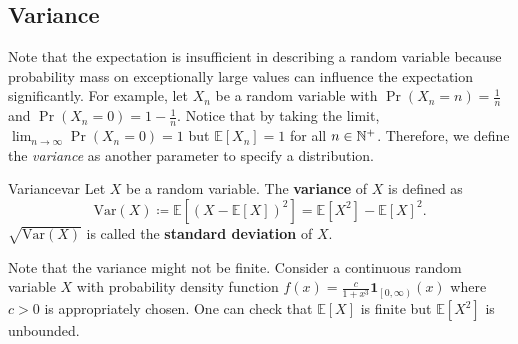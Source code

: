 \documentclass[math, code]{amznotes}
\theoremstyle{remark}
\begin{document}
\subsection{Variance}
Note that the expectation is insufficient in describing a random variable because probability mass on exceptionally large values can influence the expectation significantly. For example, let $X_n$ be a random variable with $\Pr\left(X_n = n\right) = \frac{1}{n}$ and $\Pr\left(X_n = 0\right) = 1 - \frac{1}{n}$. Notice that by taking the limit, $\lim_{n \to \infty}\Pr\left(X_n = 0\right) = 1$ but $\mathbb{E}\left[X_n\right] = 1$ for all $n \in \mathbb{N}^+$. Therefore, we define the \textit{variance} as another parameter to specify a distribution.
\begin{dfnbox}{Variance}{var}
    Let $X$ be a random variable. The {\color{red} \textbf{variance}} of $X$ is defined as 
    \begin{equation*}
        \mathrm{Var}\left(X\right) \coloneqq \mathbb{E}\left[\left(X - \mathbb{E}\left[X\right]\right)^2\right] = \mathbb{E}\left[X^2\right] - \mathbb{E}\left[X\right]^2.
    \end{equation*}
    $\sqrt{\mathrm{Var}\left(X\right)}$ is called the {\color{red} \textbf{standard deviation}} of $X$.
\end{dfnbox}
Note that the variance might not be finite. Consider a continuous random variable $X$ with probability density function $f\left(x\right) = \frac{c}{1 + x^3}\mathbf{1}_{\left[0, \infty\right)}\left(x\right)$ where $c > 0$ is appropriately chosen. One can check that $\mathbb{E}\left[X\right]$ is finite but $\mathbb{E}\left[X^2\right]$ is unbounded.
\end{document}
